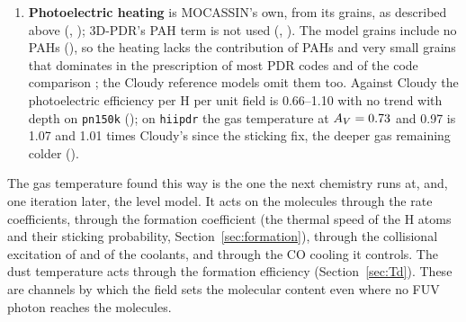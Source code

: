 \begin{enumerate}
\begin{itemize}
    expression of \citet[their eq.~A23]{TielensHollenbach1985}: about 8\,eV of
    heat per primary ionisation in molecular gas, helium included, with $\zeta$
    the rate per \Htwo{}. Ionisations in atomic gas deposit no heat in this
    term, which \citet{TielensHollenbach1985} justify by cosmic-ray heating
    being unimportant there;
  \item turbulent dissipation, $\Gamma_{\mathrm{turb}}=3.5\times10^{-28}\,(v_{\mathrm{turb}}/\mathrm{km\,s^{-1}})^3\,
    (L_{\mathrm{turb}}/\mathrm{pc})^{-1}\,n_{\mathrm H}$\,erg\,cm$^{-3}$\,s$^{-1}$ with
    $L_{\mathrm{turb}}=5$\,pc fixed and $v_{\mathrm{turb}}$ = , which the
    vendored code attributes to \citet{Black1987}: $7\times10^{-29}$\,erg\,s$^{-1}$
    per H nucleus at the default 1\,km\,s$^{-1}$;
  \item the energy released by exothermic reactions (for example the
    dissociative recombination of HCO$^+$, H$_3^+$ and H$_3$O$^+$, and He$^+$ with
    \Htwo{} and CO),
    the reactions being found automatically in the network, after
    \citet{Clavel1978}, who found that such reactions could contribute
    significantly to the heating if their energy is released entirely as
    kinetic energy, as is assumed here.
  \end{itemize}
\item \textbf{Photoelectric heating} is MOCASSIN's own, from its grains, as
  described above (, ); 3D-PDR's PAH term is not used
  (, ). The model grains include no PAHs (),
  so the heating lacks the contribution of PAHs and very small grains that
  dominates in the \citet{BakesTielens1994} prescription of most PDR codes
  and of the code comparison \citep{Rollig2007}; the Cloudy reference models
  omit them too. Against Cloudy the photoelectric efficiency per H per unit
  field is 0.66--1.10 with no trend with depth on \texttt{pn150k}
  (); on \texttt{hiipdr} the gas temperature at $A_{V}=0.73$ and 0.97
  is 1.07 and 1.01 times Cloudy's since the sticking fix, the deeper gas
  remaining colder ().
\end{enumerate}

The gas temperature found this way is the one the next chemistry runs at,
and, one iteration later, the level model. It acts on the molecules through
the rate coefficients, through the \Htwo{} formation coefficient (the thermal
speed of the H atoms and their sticking probability,
Section~\ref{sec:formation}), through the collisional excitation of \Htwo{}
and of the coolants, and through the CO cooling it controls. The dust
temperature acts through the formation efficiency (Section~\ref{sec:Td}).
These are channels by which the field sets the molecular content even where
no FUV photon reaches the molecules.

